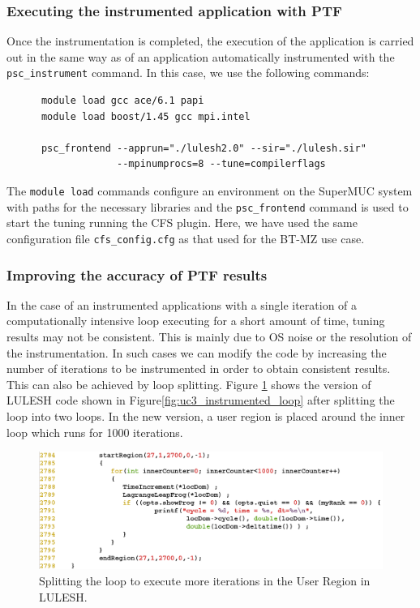 \subsubsection{Executing the instrumented application with PTF}

Once the instrumentation is completed, the execution of the application is carried out in the same way as of an application automatically instrumented with the {\tt psc\_instrument} command. In this case, we use the following commands:

\begin{verbatim}
      module load gcc ace/6.1 papi
      module load boost/1.45 gcc mpi.intel
      
      psc_frontend --apprun="./lulesh2.0" --sir="./lulesh.sir"
                   --mpinumprocs=8 --tune=compilerflags
\end{verbatim}

The \texttt{module load} commands configure an environment on the SuperMUC system with paths for the necessary libraries and the \texttt{psc\_frontend} command is used to start the tuning running the CFS plugin. Here, we have used the same configuration file {\tt cfs\_config.cfg} as that used for the BT-MZ use case.
		
	
\subsubsection{Improving the accuracy of PTF results}
In the case of an instrumented applications with a single iteration of a computationally intensive loop executing for a short amount of time, tuning results may not be consistent. This is mainly due to OS noise or the resolution of the instrumentation. In such cases we can modify the code by increasing the number of iterations to be instrumented in order to obtain consistent results. This can also be achieved by loop splitting. Figure \ref{fig:lulesh_split_loop.png} shows the version of LULESH code shown in Figure\ref{fig:uc3_instrumented_loop} after splitting the loop into two loops. In the new version, a user region is placed around the inner loop which runs for 1000 iterations.

\begin{figure}[H]
	\centering
	\includegraphics[width=\textwidth]{../BPG/images/lulesh_split_loop.png}
	\caption{Splitting the loop to execute more iterations in the User Region in LULESH.}
	\label{fig:lulesh_split_loop.png}
\end{figure}

